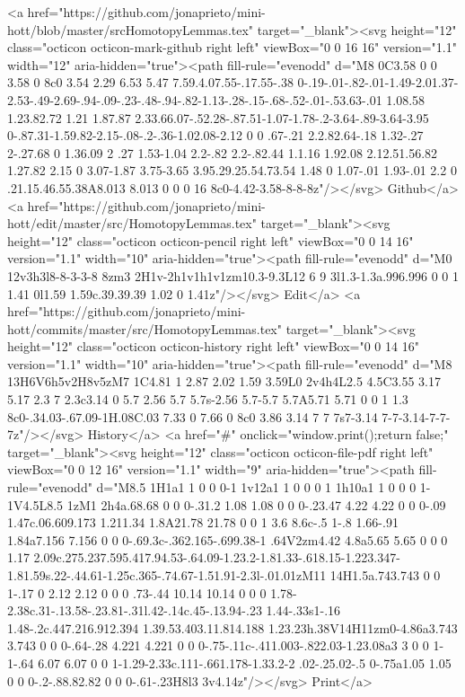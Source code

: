 {      <a href="https://github.com/jonaprieto/mini-hott/blob/master/srcHomotopyLemmas.tex" target="_blank"><svg height="12" class="octicon octicon-mark-github right left" viewBox="0 0 16 16" version="1.1" width="12" aria-hidden="true"><path fill-rule="evenodd" d="M8 0C3.58 0 0 3.58 0 8c0 3.54 2.29 6.53 5.47 7.59.4.07.55-.17.55-.38 0-.19-.01-.82-.01-1.49-2.01.37-2.53-.49-2.69-.94-.09-.23-.48-.94-.82-1.13-.28-.15-.68-.52-.01-.53.63-.01 1.08.58 1.23.82.72 1.21 1.87.87 2.33.66.07-.52.28-.87.51-1.07-1.78-.2-3.64-.89-3.64-3.95 0-.87.31-1.59.82-2.15-.08-.2-.36-1.02.08-2.12 0 0 .67-.21 2.2.82.64-.18 1.32-.27 2-.27.68 0 1.36.09 2 .27 1.53-1.04 2.2-.82 2.2-.82.44 1.1.16 1.92.08 2.12.51.56.82 1.27.82 2.15 0 3.07-1.87 3.75-3.65 3.95.29.25.54.73.54 1.48 0 1.07-.01 1.93-.01 2.2 0 .21.15.46.55.38A8.013 8.013 0 0 0 16 8c0-4.42-3.58-8-8-8z"/></svg> Github</a>
      <a href="https://github.com/jonaprieto/mini-hott/edit/master/src/HomotopyLemmas.tex" target="_blank"><svg height="12" class="octicon octicon-pencil right left" viewBox="0 0 14 16" version="1.1" width="10" aria-hidden="true"><path fill-rule="evenodd" d="M0 12v3h3l8-8-3-3-8 8zm3 2H1v-2h1v1h1v1zm10.3-9.3L12 6 9 3l1.3-1.3a.996.996 0 0 1 1.41 0l1.59 1.59c.39.39.39 1.02 0 1.41z"/></svg> Edit</a>
      <a href="https://github.com/jonaprieto/mini-hott/commits/master/src/HomotopyLemmas.tex" target="_blank"><svg height="12" class="octicon octicon-history right left" viewBox="0 0 14 16" version="1.1" width="10" aria-hidden="true"><path fill-rule="evenodd" d="M8 13H6V6h5v2H8v5zM7 1C4.81 1 2.87 2.02 1.59 3.59L0 2v4h4L2.5 4.5C3.55 3.17 5.17 2.3 7 2.3c3.14 0 5.7 2.56 5.7 5.7s-2.56 5.7-5.7 5.7A5.71 5.71 0 0 1 1.3 8c0-.34.03-.67.09-1H.08C.03 7.33 0 7.66 0 8c0 3.86 3.14 7 7 7s7-3.14 7-7-3.14-7-7-7z"/></svg> History</a>
      <a  href="#" onclick="window.print();return false;" target="_blank"><svg height="12" class="octicon octicon-file-pdf right left" viewBox="0 0 12 16" version="1.1" width="9" aria-hidden="true"><path fill-rule="evenodd" d="M8.5 1H1a1 1 0 0 0-1 1v12a1 1 0 0 0 1 1h10a1 1 0 0 0 1-1V4.5L8.5 1zM1 2h4a.68.68 0 0 0-.31.2 1.08 1.08 0 0 0-.23.47 4.22 4.22 0 0 0-.09 1.47c.06.609.173 1.211.34 1.8A21.78 21.78 0 0 1 3.6 8.6c-.5 1-.8 1.66-.91 1.84a7.156 7.156 0 0 0-.69.3c-.362.165-.699.38-1 .64V2zm4.42 4.8a5.65 5.65 0 0 0 1.17 2.09c.275.237.595.417.94.53-.64.09-1.23.2-1.81.33-.618.15-1.223.347-1.81.59s.22-.44.61-1.25c.365-.74.67-1.51.91-2.3l-.01.01zM11 14H1.5a.743.743 0 0 1-.17 0 2.12 2.12 0 0 0 .73-.44 10.14 10.14 0 0 0 1.78-2.38c.31-.13.58-.23.81-.31l.42-.14c.45-.13.94-.23 1.44-.33s1-.16 1.48-.2c.447.216.912.394 1.39.53.403.11.814.188 1.23.23h.38V14H11zm0-4.86a3.743 3.743 0 0 0-.64-.28 4.221 4.221 0 0 0-.75-.11c-.411.003-.822.03-1.23.08a3 3 0 0 1-1-.64 6.07 6.07 0 0 1-1.29-2.33c.111-.661.178-1.33.2-2 .02-.25.02-.5 0-.75a1.05 1.05 0 0 0-.2-.88.82.82 0 0 0-.61-.23H8l3 3v4.14z"/></svg> Print</a>
}
